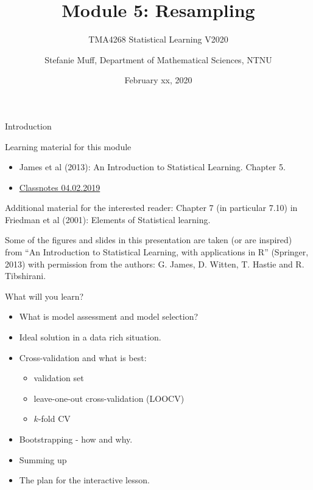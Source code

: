 \documentclass[10pt,ignorenonframetext,]{beamer}
\title{Module 5: Resampling}
\subtitle{TMA4268 Statistical Learning V2020}
\author{Stefanie Muff, Department of Mathematical Sciences, NTNU}
\date{February xx, 2020}
\providecommand{\tightlist}{%
  \setlength{\itemsep}{0pt}\setlength{\parskip}{0pt}}
\begin{document}
\frame{\titlepage}

\begin{frame}{Introduction}

\begin{block}{Learning material for this module}

\begin{itemize}
\tightlist
\item
  James et al (2013): An Introduction to Statistical Learning. Chapter
  5.
\item
  \href{https://www.math.ntnu.no/emner/TMA4268/2019v/notes/M5L1notes.pdf}{Classnotes
  04.02.2019}
\end{itemize}

Additional material for the interested reader: Chapter 7 (in particular
7.10) in Friedman et al (2001): Elements of Statistical learning.

\vspace{2mm}

Some of the figures and slides in this presentation are taken (or are
inspired) from ``An Introduction to Statistical Learning, with
applications in R'' (Springer, 2013) with permission from the authors:
G. James, D. Witten, T. Hastie and R. Tibshirani.

\end{block}

\end{frame}

\begin{frame}

\begin{block}{What will you learn?}

\begin{itemize}
\tightlist
\item
  What is model assessment and model selection?
\item
  Ideal solution in a data rich situation.
\item
  Cross-validation and what is best:

  \begin{itemize}
  \tightlist
  \item
    validation set
  \item
    leave-one-out cross-validation (LOOCV)
  \item
    \(k\)-fold CV
  \end{itemize}
\item
  Bootstrapping - how and why.
\item
  Summing up
\item
  The plan for the interactive lesson.
\end{itemize}

\end{block}

\end{frame}
\end{document}
